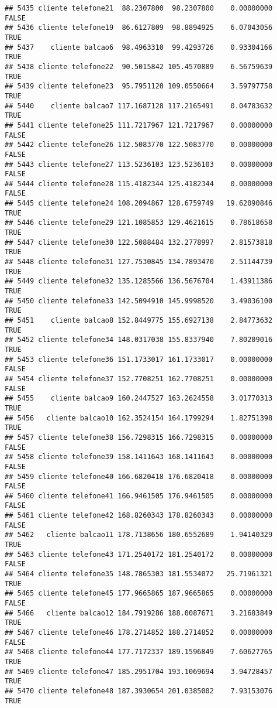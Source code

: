 \documentclass[
]{article}
\begin{document}
\begin{verbatim}
## 5435 cliente telefone21  88.2307800  98.2307800    0.00000000    FALSE
## 5436 cliente telefone19  86.6127809  98.8894925    6.07043056     TRUE
## 5437    cliente balcao6  98.4963310  99.4293726    0.93304166     TRUE
## 5438 cliente telefone22  90.5015842 105.4570889    6.56759639     TRUE
## 5439 cliente telefone23  95.7951120 109.0550664    3.59797758     TRUE
## 5440    cliente balcao7 117.1687128 117.2165491    0.04783632     TRUE
## 5441 cliente telefone25 111.7217967 121.7217967    0.00000000    FALSE
## 5442 cliente telefone26 112.5083770 122.5083770    0.00000000    FALSE
## 5443 cliente telefone27 113.5236103 123.5236103    0.00000000    FALSE
## 5444 cliente telefone28 115.4182344 125.4182344    0.00000000    FALSE
## 5445 cliente telefone24 108.2094867 128.6759749   19.62090846     TRUE
## 5446 cliente telefone29 121.1085853 129.4621615    0.78618658     TRUE
## 5447 cliente telefone30 122.5088484 132.2778997    2.81573818     TRUE
## 5448 cliente telefone31 127.7530845 134.7893470    2.51144739     TRUE
## 5449 cliente telefone32 135.1285566 136.5676704    1.43911386     TRUE
## 5450 cliente telefone33 142.5094910 145.9998520    3.49036100     TRUE
## 5451    cliente balcao8 152.8449775 155.6927138    2.84773632     TRUE
## 5452 cliente telefone34 148.0317038 155.8337940    7.80209016     TRUE
## 5453 cliente telefone36 151.1733017 161.1733017    0.00000000    FALSE
## 5454 cliente telefone37 152.7708251 162.7708251    0.00000000    FALSE
## 5455    cliente balcao9 160.2447527 163.2624558    3.01770313     TRUE
## 5456   cliente balcao10 162.3524154 164.1799294    1.82751398     TRUE
## 5457 cliente telefone38 156.7298315 166.7298315    0.00000000    FALSE
## 5458 cliente telefone39 158.1411643 168.1411643    0.00000000    FALSE
## 5459 cliente telefone40 166.6820418 176.6820418    0.00000000    FALSE
## 5460 cliente telefone41 166.9461505 176.9461505    0.00000000    FALSE
## 5461 cliente telefone42 168.8260343 178.8260343    0.00000000    FALSE
## 5462   cliente balcao11 178.7138656 180.6552689    1.94140329     TRUE
## 5463 cliente telefone43 171.2540172 181.2540172    0.00000000    FALSE
## 5464 cliente telefone35 148.7865303 181.5534072   25.71961321     TRUE
## 5465 cliente telefone45 177.9665865 187.9665865    0.00000000    FALSE
## 5466   cliente balcao12 184.7919286 188.0087671    3.21683849     TRUE
## 5467 cliente telefone46 178.2714852 188.2714852    0.00000000    FALSE
## 5468 cliente telefone44 177.7172337 189.1596849    7.60627765     TRUE
## 5469 cliente telefone47 185.2951704 193.1069694    3.94728457     TRUE
## 5470 cliente telefone48 187.3930654 201.0385002    7.93153076     TRUE

\end{verbatim}
\end{document}
